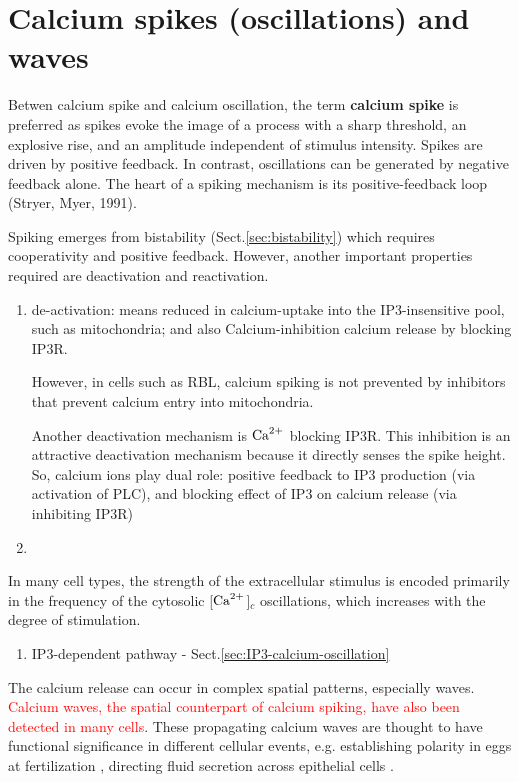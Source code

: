 \section{Calcium spikes (oscillations) and waves}
\label{sec:calcium-oscill-waves}
\label{sec:calcium-oscillation}
\label{sec:calcium-spike}

Betwen calcium spike and calcium oscillation, the term {\bf calcium spike} is
preferred as spikes evoke the image of a process with a sharp threshold, an
explosive rise, and an amplitude independent of stimulus intensity. Spikes are
driven by positive feedback. In contrast, oscillations can be generated by
negative feedback alone. The heart of a spiking mechanism is its
positive-feedback loop (Stryer, Myer, 1991).

Spiking emerges from bistability (Sect.\ref{sec:bistability}) which requires
cooperativity and positive feedback. However, another important properties
required are deactivation and reactivation.
\begin{enumerate}
  \item de-activation: means reduced in calcium-uptake into the IP3-insensitive
  pool, such as mitochondria; and also Calcium-inhibition calcium release by
  blocking IP3R.
  
However, in cells such as RBL, calcium spiking is not prevented by inhibitors
that prevent calcium entry into mitochondria. 

Another deactivation mechanism is ${\text{Ca}^{2+}}$ blocking IP3R.
This inhibition is an attractive deactivation mechanism because it directly
senses the spike height.
So, calcium ions play dual role: positive feedback to IP3 production (via
activation of PLC), and blocking effect of IP3 on calcium release (via
inhibiting IP3R)
 
  \item 
\end{enumerate}

In many cell types, the strength of the extracellular stimulus is encoded
primarily in the frequency of the cytosolic [${\text{Ca}^{2+}}$]$_c$ oscillations, which
increases with the degree of stimulation.
\begin{enumerate}
  \item IP3-dependent pathway - Sect.\ref{sec:IP3-calcium-oscillation}
  
\end{enumerate}

The calcium release can occur in complex spatial patterns, especially waves.
\textcolor{red}{Calcium waves, the spatial counterpart of calcium spiking, have
also been detected in many cells}. These propagating calcium waves are thought
to have functional significance in different cellular events, e.g. establishing
polarity in eggs at fertilization \citep{gilkey1978}, directing fluid secretion
across epithelial cells \citep{kasai1990}.

